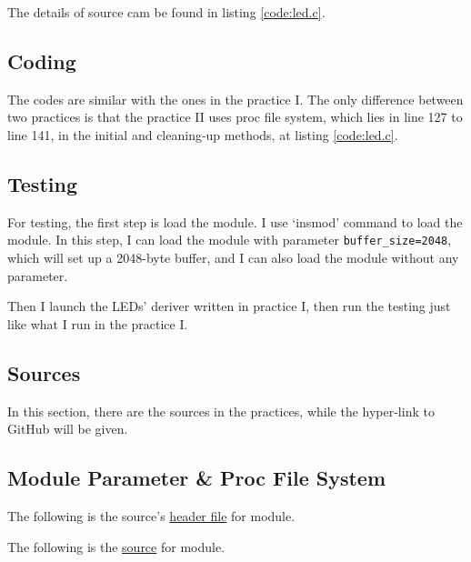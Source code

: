\documentclass{report}
\begin{document}
    The details of source cam be found in listing \ref{code:led.c}.
        
        
    \section{Coding}
    \label{chap:mpnpsf:coding}
    
    The codes are similar with the ones in the practice I. The only difference between two
    practices is that the practice II uses proc file system, which lies in line 127 to line 141,
    in the initial and cleaning-up methods, at listing \ref{code:led.c}.
    
    \section{Testing}
    \label{chap:mpnpsf:test}
    
    For testing, the first step is load the module. I use `insmod' command to load the module.
    In this step, I can load the module with parameter \lstinline|buffer_size=2048|, 
    which will set up a 2048-byte buffer, and I can also load the module without any parameter.
    
    Then I launch the LEDs' deriver written in practice I, then run the testing just like
    what I run in the practice I.
    
        
    \begin{appendix}
        \chapter{Sources}
        \label{achap:source}
        
        In this section, there are the sources in the practices, while the hyper-link to GitHub will be given.
        
        \section{Module Parameter \& Proc File System}
        \label{src:mpnpsf}
        
        The following is the source's \href{https://github.com/Qinka/embedded-system-design-homework/blob/master/practice2/led.h}{header file} for module.
        
        
        The following is the \href{https://github.com/Qinka/embedded-system-design-homework/blob/master/practice2/led.c}{source}
        for module.
        
        
        
        
    \end{appendix}
    
\end{document}
